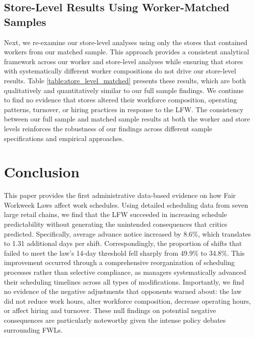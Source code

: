 \documentclass[letterpaper,11pt,leqno]{article}
\theoremstyle{paper}
\begin{document}
\subsection{Store-Level Results Using Worker-Matched Samples}

Next, we re-examine our store-level analyses using only the stores that contained workers from our matched sample. This approach provides a consistent analytical framework across our worker and store-level analyses while ensuring that stores with systematically different worker compositions do not drive our store-level results. Table \ref{table:store_level_matched} presents these results, which are both qualitatively and quantitatively similar to our full sample findings. We continue to find no evidence that stores altered their workforce composition, operating patterns, turnover, or hiring practices in response to the LFW. The consistency between our full sample and matched sample results at both the worker and store levels reinforces the robustness of our findings across different sample specifications and empirical approaches.







\section{Conclusion} \label{sec:conclusions}

This paper provides the first administrative data-based evidence on how Fair Workweek Laws affect work schedules. Using detailed scheduling data from seven large retail chains, we find that the LFW succeeded in increasing schedule predictability without generating the unintended consequences that critics predicted. Specifically, average advance notice increased by 8.6\%, which translates to 1.31 additional days per shift. Correspondingly, the proportion of shifts that failed to meet the law's 14-day threshold fell sharply from 49.9\% to 34.8\%. This improvement occurred through a comprehensive reorganization of scheduling processes rather than selective compliance, as managers systematically advanced their scheduling timelines across all types of modifications. Importantly, we find no evidence of the negative adjustments that opponents warned about: the law did not reduce work hours, alter workforce composition, decrease operating hours, or affect hiring and turnover. These null findings on potential negative consequences are particularly noteworthy given the intense policy debates surrounding FWLs.
\end{document}

